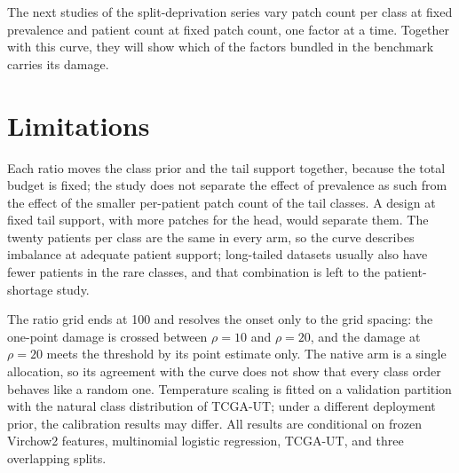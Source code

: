 The next studies of the split-deprivation series vary patch count per class at fixed prevalence and patient count at fixed patch count, one factor at a time. Together with this curve, they will show which of the factors bundled in the benchmark carries its damage.

\section{Limitations}
\label{sec:limitations}
Each ratio moves the class prior and the tail support together, because the total budget is fixed; the study does not separate the effect of prevalence as such from the effect of the smaller per-patient patch count of the tail classes. A design at fixed tail support, with more patches for the head, would separate them. The twenty patients per class are the same in every arm, so the curve describes imbalance at adequate patient support; long-tailed datasets usually also have fewer patients in the rare classes, and that combination is left to the patient-shortage study.

The ratio grid ends at 100 and resolves the onset only to the grid spacing: the one-point damage is crossed between $\rho=10$ and $\rho=20$, and the damage at $\rho=20$ meets the threshold by its point estimate only. The native arm is a single allocation, so its agreement with the curve does not show that every class order behaves like a random one. Temperature scaling is fitted on a validation partition with the natural class distribution of TCGA-UT; under a different deployment prior, the calibration results may differ. All results are conditional on frozen Virchow2 features, multinomial logistic regression, TCGA-UT, and three overlapping splits.
